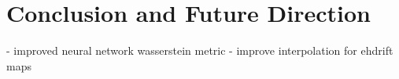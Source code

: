 \chapter{Conclusion and Future Direction}
- improved neural network wasserstein metric
- improve interpolation for ehdrift maps
\label{chap:conclusion}